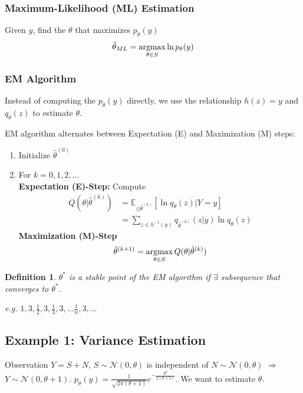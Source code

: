 \documentclass[11pt,a4paper]{article}
\newcommand{\argmax}{\operatornamewithlimits{argmax}}
\newtheorem{definition}{Definition}
\begin{document}
\subsubsection*{Maximum-Likelihood (ML) Estimation}
Given $y$, find the $\theta$ that maximizes $p_\theta(y)$
$$\hat{\theta}_{ML}=\argmax_{\theta\in S}\ln p_\theta(y)$$
\subsubsection*{EM Algorithm}
Instead of computing the $p_\theta(y)$ directly, we use the relationship $h(z)=y$ and $q_\theta(z)$ to estimate $\theta$.

EM algorithm alternates between Expectation (E) and Maximization (M) steps:
\begin{enumerate}
    \item Initialize $\hat{\theta}^{(0)}$
    \item For $k=0,1,2,...$\\
    \textbf{Expectation (E)-Step:}
        Compute
        \begin{equation}
            \begin{aligned}
                Q(\theta|\hat{\theta}^{(k)})
                &=\mathbb{E}_{z|\hat{\theta}^{(k)}}[\ln q_\theta(z)|Y=y]\\
                &=\sum_{z\in h^{-1}(y)}q_{\hat{\theta}^{(k)}}(z|y)\ln q_\theta(z)
            \end{aligned}
            \nonumber
        \end{equation}
    \textbf{Maximization (M)-Step} $$\hat{\theta}^{(k+1)}=\argmax_{\theta\in S}Q(\theta|\hat{\theta}^{(k)})$$
\end{enumerate}

\begin{definition}
    $\theta^*$ is a stable point of the EM algorithm if $\exists$ subsequence that converges to $\theta^*$.

    e.g. $1,3,\frac{1}{2},3,\frac{1}{3},3,...\frac{1}{n},3,...$
\end{definition}

\subsection{Example 1: Variance Estimation}
Observation $Y=S+N$, $S\sim \mathcal{N}(0,\theta)$ is independent of $N\sim \mathcal{N}(0,\theta)$ $\Rightarrow$ $Y\sim \mathcal{N}(0,\theta+1)$. $p_\theta(y)=\frac{1}{\sqrt{2\pi(\theta+1)}}e^{-\frac{y^2}{2(\theta+1)}}$. We want to estimate $\theta$.
\end{document}
